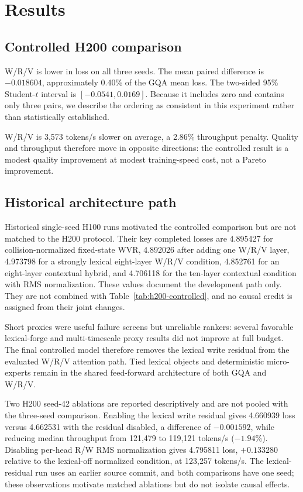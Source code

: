 \section{Results}
\label{sec:results}

\subsection{Controlled H200 comparison}



W/R/V is lower in loss on all three seeds. The mean paired difference is $-0.018604$, approximately 0.40\% of the GQA mean loss. The two-sided 95\% Student-$t$ interval is $[-0.0541,0.0169]$. Because it includes zero and contains only three pairs, we describe the ordering as consistent in this experiment rather than statistically established.

W/R/V is 3,573 tokens/s slower on average, a 2.86\% throughput penalty. Quality and throughput therefore move in opposite directions: the controlled result is a modest quality improvement at modest training-speed cost, not a Pareto improvement.

\subsection{Historical architecture path}

Historical single-seed H100 runs motivated the controlled comparison but are not matched to the H200 protocol. Their key completed losses are 4.895427 for collision-normalized fixed-state WVR, 4.892026 after adding one W/R/V layer, 4.973798 for a strongly lexical eight-layer W/R/V condition, 4.852761 for an eight-layer contextual hybrid, and 4.706118 for the ten-layer contextual condition with RMS normalization. These values document the development path only. They are not combined with Table~\ref{tab:h200-controlled}, and no causal credit is assigned from their joint changes.

Short proxies were useful failure screens but unreliable rankers: several favorable lexical-forge and multi-timescale proxy results did not improve at full budget. The final controlled model therefore removes the lexical write residual from the evaluated W/R/V attention path. Tied lexical objects and deterministic micro-experts remain in the shared feed-forward architecture of both GQA and W/R/V.

Two H200 seed-42 ablations are reported descriptively and are not pooled with the three-seed comparison. Enabling the lexical write residual gives 4.660939 loss versus 4.662531 with the residual disabled, a difference of $-0.001592$, while reducing median throughput from 121,479 to 119,121 tokens/s ($-1.94\%$). Disabling per-head R/W RMS normalization gives 4.795811 loss, $+0.133280$ relative to the lexical-off normalized condition, at 123,257 tokens/s. The lexical-residual run uses an earlier source commit, and both comparisons have one seed; these observations motivate matched ablations but do not isolate causal effects.


